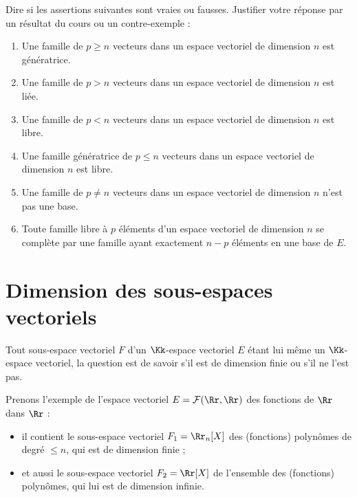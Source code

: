 \documentclass[class=report,crop=false]{standalone}
\begin{document}

\begin{miniexercices}
Dire si les assertions suivantes sont vraies ou fausses.
Justifier votre réponse par un résultat du cours ou un contre-exemple :
\begin{enumerate}
  \item Une famille de $p \ge n$ vecteurs dans un espace vectoriel
  de dimension $n$ est génératrice.

  \item Une famille de $p > n$ vecteurs dans un espace vectoriel
  de dimension $n$ est liée.

  \item Une famille de $p < n$ vecteurs dans un espace vectoriel
  de dimension $n$ est libre.

  \item Une famille génératrice de $p \le n$ vecteurs dans un espace vectoriel
  de dimension $n$ est libre.

  \item Une famille de $p \neq n$ vecteurs dans un espace vectoriel
  de dimension $n$ n'est pas une base.

  \item Toute famille libre à $p$ éléments d'un espace vectoriel de dimension $n$
  se complète par une famille ayant exactement $n-p$ éléments en une base de $E$.
\end{enumerate}
\end{miniexercices}




\section{Dimension des sous-espaces vectoriels}

Tout sous-espace vectoriel $F$ d'un $\Kk$-espace vectoriel $E$ étant lui même
un $\Kk$-espace vectoriel, la question est de savoir
s'il est de dimension finie ou s'il ne l'est pas.

Prenons l'exemple de l'espace vectoriel $E = \mathcal{F}(\Rr,\Rr)$
des fonctions de $\Rr$ dans $\Rr$ :
\begin{itemize}
  \item il contient le sous-espace vectoriel $F_1 = \Rr_n[X]$
  des (fonctions) polynômes de degré $\le n$, qui est de dimension finie ;

  \item et aussi le sous-espace vectoriel $F_2=\Rr[X]$ de l'ensemble des
  (fonctions) polynômes, qui lui est de dimension infinie.
\end{itemize}
\end{document}
